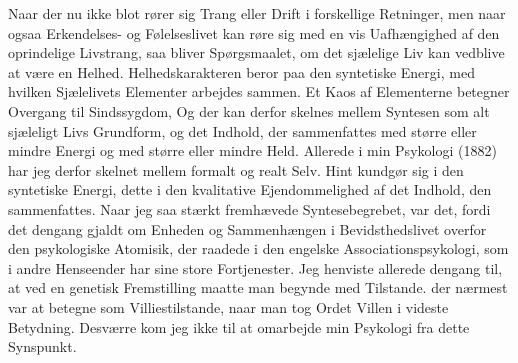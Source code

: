 \documentclass[12pt]{article}
\newcommand{\opage}[1]{\marginnote{\footnotesize\textit{[#1]}}}
\begin{document}
Naar der nu ikke blot rører sig Trang eller Drift i forskellige
Retninger, men naar ogsaa Erkendelses- og Følelseslivet kan røre sig
med en vis Uafhængighed af den oprindelige Livstrang, saa bliver
Spørgsmaalet, om det sjælelige Liv kan vedblive at være en Helhed.
Helhedskarakteren beror paa den syntetiske Energi, med hvilken
Sjælelivets Elementer arbejdes sammen. Et Kaos af Elementerne
\opage{36}betegner Overgang til Sindssygdom, Og der kan derfor skelnes
mellem Syntesen som alt sjæleligt Livs Grundform, og det Indhold, der
sammenfattes med større eller mindre Energi og med større eller mindre
Held. Allerede i min Psykologi (1882) har jeg derfor skelnet mellem
formalt og realt Selv. Hint kundgør sig i den syntetiske Energi, dette
i den kvalitative Ejendommelighed af det Indhold, den sammenfattes.
Naar jeg saa stærkt fremhævede Syntesebegrebet, var det, fordi det
dengang gjaldt om Enheden og Sammenhængen i Bevidsthedslivet overfor
den psykologiske Atomisik, der raadede i den engelske
Associationspsykologi, som i andre Henseender har sine store
Fortjenester. Jeg henviste allerede dengang til, at ved en genetisk
Fremstilling maatte man begynde med
Tilstande. der nærmest var at betegne som Villiestilstande, naar man
tog Ordet Villen i videste Betydning. Desværre kom jeg ikke til at
omarbejde min Psykologi fra dette Synspunkt.
\end{document}
